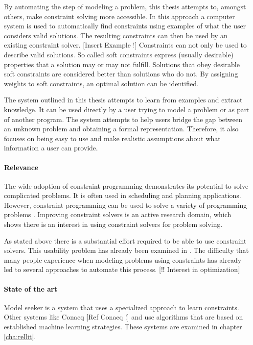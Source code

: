 By automating the step of modeling a problem, this thesis attempts to, amongst others, make constraint solving more accessible. In this approach a computer system is used to automatically find constraints using examples of what the user considers valid solutions. The resulting constraints can then be used by an existing constraint solver. [Insert Example !] Constraints can not only be used to describe valid solutions. So called soft constraints express (usually desirable) properties that a solution may or may not fulfill. Solutions that obey desirable soft constraints are considered better than solutions who do not. By assigning weights to soft constraints, an optimal solution can be identified.

The system outlined in this thesis attempts to learn from examples and extract knowledge. It can be used directly by a user trying to model a problem or as part of another program. The system attempts to help users bridge the gap between an unknown problem and obtaining a formal representation. Therefore, it also focuses on being easy to use and make realistic assumptions about what information a user can provide. 

\paragraph{Relevance}
The wide adoption of constraint programming demonstrates its potential to solve complicated problems. It is often used in scheduling and planning applications. However, constraint programming can be used to solve a variety of programming problems \cite{Dymchenki:GoogleCodeJamEclipse}. Improving constraint solvers is an active research domain, which shows there is an interest in using constraint solvers for problem solving.

As stated above there is a substantial effort required to be able to use constraint solvers. This usability problem has already been examined in \cite{Wallace:PrinciplesCP}. The difficulty that many people experience when modeling problems using constraints has already led to several approaches to automate this process. [!! Interest in optimization]

\paragraph{State of the art}
\textbf{\color{red}{[!! Unfinished]}}
Model seeker \cite{Beldiceanu:ModelSeeker} is a system that uses a specialized approach to learn constraints. Other systems like Conacq [Ref Conacq !] and \cite{Lallouet:LearningCP} use algorithms that are based on established machine learning strategies. These systems are examined in chapter \ref{cha:rellit}.

